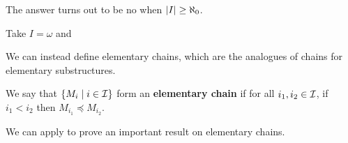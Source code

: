 The answer turns out to be no when $\left\lvert I \right\rvert \geq \aleph_0$.

\begin{boxcexample}
    Take $I = \omega$ and \sorry
\end{boxcexample}

We can instead define elementary chains, which are the analogues of chains for elementary substructures.

\begin{boxdefinition} %
    We say that $\left\{ M_{i} \; \middle\vert \; i \in \mathcal{I} \right\}$ form an \textbf{elementary chain} if for all $i_1, i_2 \in \mathcal{I}$, if $i_1 < i_2$ then $M_{i_1} \preceq M_{i_2}$.
\end{boxdefinition}

We can apply  to prove an important result on elementary chains.

